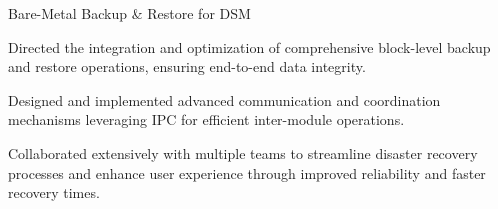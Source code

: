 \begin{cventries}
  \cventry
    {} %
    {Bare-Metal Backup \& Restore for DSM} %
    {} %
    {} %
    {
      \vspace{-1.2em}
      \begin{cvitems} %
        \item {Directed the integration and optimization of comprehensive block-level backup and restore operations, ensuring end-to-end data integrity.}
        \item {Designed and implemented advanced communication and coordination mechanisms leveraging IPC for efficient inter-module operations.}
        \item {Collaborated extensively with multiple teams to streamline disaster recovery processes and enhance user experience through improved reliability and faster recovery times.}
      \end{cvitems}
    }
  
\end{cventries}